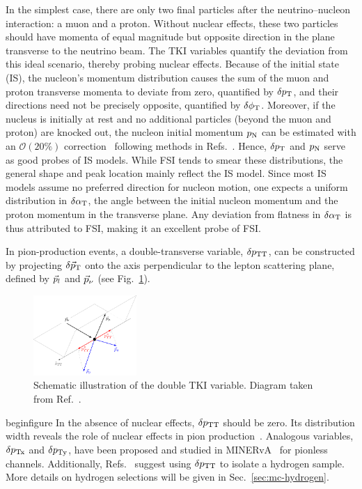 In the simplest case, there are only two final particles after the neutrino–nucleon interaction: a muon and a proton. 
Without nuclear effects, these two particles should have momenta of equal magnitude but opposite direction in the plane transverse to the neutrino beam.
The TKI variables quantify the deviation from this ideal scenario, thereby probing nuclear effects. 
Because of the initial state (IS), the nucleon’s momentum distribution causes the sum of the muon and proton transverse momenta to deviate from zero, quantified by $\delta p_\textrm{T}$, and their directions need not be precisely opposite, quantified by $\delta\phi_\textrm{T}$.
Moreover, if the nucleus is initially at rest and no additional particles (beyond the muon and proton) are knocked out, the nucleon initial momentum $p_\textrm{N}$ can be estimated with an $\mathcal{O}(20\%)$ correction~\cite{Yang:2023dxk} following methods in Refs.~\cite{Furmanski:2016wqo, Lu:2019nmf}. 
Hence, $\delta p_\textrm{T}$ and $p_\textrm{N}$ serve as good probes of IS models.
While FSI tends to smear these distributions, the general shape and peak location mainly reflect the IS model.
Since most IS models assume no preferred direction for nucleon motion, one expects a uniform distribution in $\delta\alpha_\textrm{T}$, the angle between the initial nucleon momentum and the proton momentum in the transverse plane.
Any deviation from flatness in $\delta\alpha_\textrm{T}$ is thus attributed to FSI, making it an excellent probe of FSI. 

In pion-production events, a double-transverse variable, $\delta p_\textrm{TT}$, can be constructed by projecting $\delta \vec{p}_\textrm{T}$ onto the axis perpendicular to the lepton scattering plane, defined by $\vec{p}_{l}$ and $\vec{p}_{\nu}$ (see Fig.~\ref{fig:dtki}).
\begin{figure}[!htb] 	
    \centering 		
    \includegraphics[width=0.35\textwidth]{figures/dptt.pdf}
    \caption{\label{fig:dtki} Schematic illustration of the double TKI variable. Diagram taken from Ref.~\cite{T2K:2021naz}.} 
\end{figure}

begin{figure}
In the absence of nuclear effects, $\delta p_\textrm{TT}$ should be zero.
Its distribution width reveals the role of nuclear effects in pion production~\cite{MINERvA:2020anu, T2K:2021naz}.
Analogous variables, $\delta p_\textrm{Tx}$ and $\delta p_\textrm{Ty}$, have been proposed and studied in MINERvA~\cite{MINERvA:2019ope} for pionless channels.
Additionally, Refs.~\cite{Lu:2015tcr,Hamacher-Baumann:2020ogq} suggest using $\delta p_\textrm{TT}$ to isolate a hydrogen sample.  
More details on hydrogen selections will be given in Sec.~\ref{sec:mc-hydrogen}.

